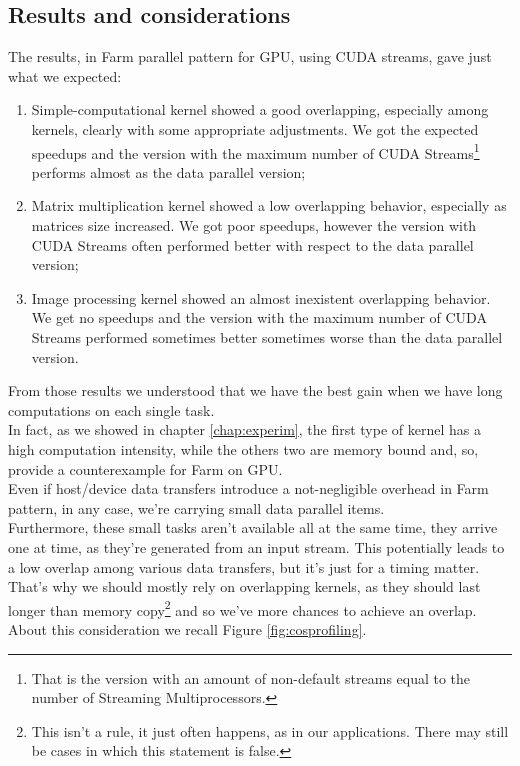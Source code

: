  \subsection{Results and considerations}
 The results, in Farm parallel pattern for GPU, using CUDA streams, gave just what we expected:
 \begin{enumerate}
 	\item Simple-computational kernel showed a good overlapping, especially among kernels, clearly with some appropriate adjustments. We got the expected speedups and the version with the maximum number of CUDA Streams\footnote{That is the version with an amount of non-default streams equal to the number of Streaming Multiprocessors.} performs almost as the data parallel version;
 	
 	
 	
 	\item Matrix multiplication kernel showed a low overlapping behavior, especially as matrices size increased. We got poor speedups, however the version with CUDA Streams often performed better with respect to the data parallel version;
 	
 	
 	
 	\item Image processing kernel showed an almost inexistent overlapping behavior. We get no speedups and the version with the maximum number of CUDA Streams performed sometimes better sometimes worse than the data parallel version.
 \end{enumerate}

 From those results we understood that we have the best gain when we have long computations on each single task.\\
 In fact, as we showed in chapter \ref{chap:experim}, the first type of kernel has a high computation intensity, while the others two are memory bound and, so, provide a counterexample for Farm on GPU.\\

  Even if host/device data transfers introduce a not-negligible overhead in Farm pattern, in any case, we're carrying small data parallel items.\\ Furthermore, these small tasks aren't available all at the same time, they arrive one at time, as they're generated from an input stream.
 This potentially leads to a low overlap among various data transfers, but it's just for a timing matter.\\ 
 That's why we should mostly rely on overlapping kernels, as they should last longer than memory copy\footnote{This isn't a rule, it just often happens, as in our applications. There may still be cases in which this statement is false.} and so we've more chances to achieve an overlap.\\
 About this consideration we recall Figure \ref{fig:cosprofiling}.
 
